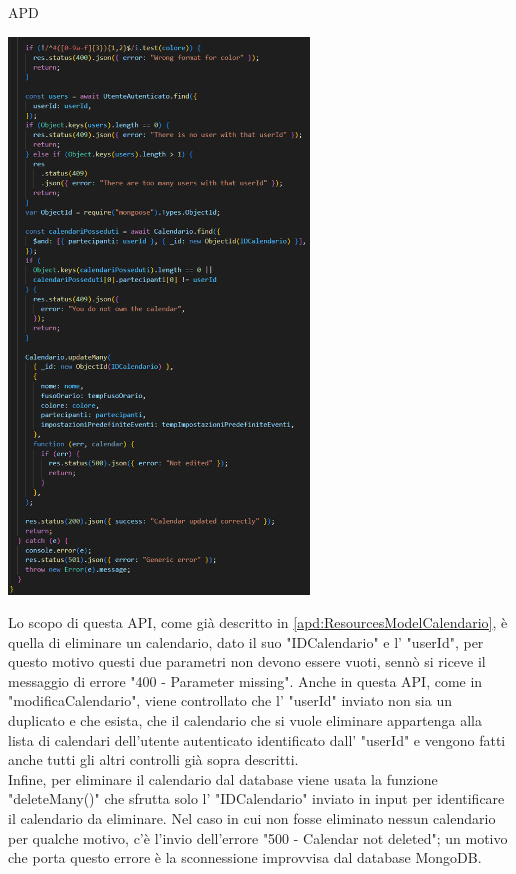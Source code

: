 \begin{listaPersonale} {APD}
\begin{listaPersonale2}[APD]{}
\begin{center}
                    \includegraphics[width=0.6\textwidth, height=0.75\textheight]{img/png/APIs/modificaCalendario2.png}
                \end{center}
                \newpage
                Lo scopo di questa API, come già descritto in \ref{apd:ResourcesModelCalendario}, è quella di eliminare un calendario, dato il suo "IDCalendario" e l' "userId", per questo motivo questi due parametri non devono essere vuoti, sennò si riceve il messaggio di errore "400 - Parameter missing". Anche in questa API, come in "modificaCalendario", viene controllato che l' "userId" inviato non sia un duplicato e che esista, che il calendario che si vuole eliminare appartenga alla lista di calendari dell'utente autenticato identificato dall' "userId" e vengono fatti anche tutti gli altri controlli già sopra descritti. \\
                Infine, per eliminare il calendario dal database viene usata la funzione "deleteMany()" che sfrutta solo l' "IDCalendario" inviato in input per identificare il calendario da eliminare. Nel caso in cui non fosse eliminato nessun calendario per qualche motivo, c'è l'invio dell'errore "500 - Calendar not deleted"; un motivo che porta questo errore è la sconnessione improvvisa dal database MongoDB.

\end{listaPersonale2}
\end{listaPersonale}

